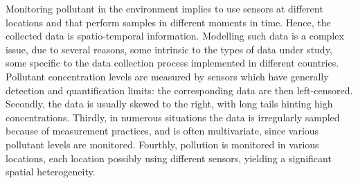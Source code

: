 Monitoring pollutant in the environment implies to use sensors at different locations and that perform samples in different moments in time. Hence, the collected data is spatio-temporal information. Modelling such data is a complex issue, due to several reasons, some intrinsic to the types of data under study, some specific to the data collection process implemented in different countries. Pollutant concentration levels are measured by sensors which have generally detection and quantification limits: the corresponding data are then left-censored. Secondly, the data is usually skewed to the right, with long tails hinting high concentrations. Thirdly, in numerous situations the data is irregularly sampled because of measurement practices, and is often multivariate, since various pollutant levels are monitored. Fourthly, pollution is monitored in various locations, each location possibly using different sensors, yielding a significant spatial heterogeneity. 

